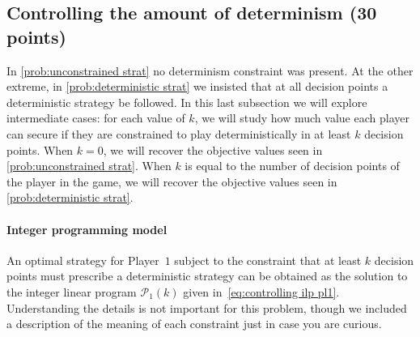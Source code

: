 \documentclass{homework}
\begin{document}
\subsection{Controlling the amount of determinism (30 points)}

In \cref{prob:unconstrained strat} no determinism constraint was present. At the other extreme, in \cref{prob:deterministic strat} we insisted that at all decision points a deterministic strategy be followed. In this last subsection we will explore intermediate cases: for each value of $k$, we will study how much value each player can secure if they are constrained to play deterministically in at least $k$ decision points. When $k=0$, we will recover the objective values seen in \cref{prob:unconstrained strat}. When $k$ is equal to the number of decision points of the player in the game, we will recover the objective values seen in \cref{prob:deterministic strat}.

\paragraph{Integer programming model} An optimal strategy for Player~$1$ subject to the constraint that at least $k$ decision points must prescribe a deterministic strategy can be obtained as the solution to the integer linear program $\mathcal{P}_1(k)$ given in~\eqref{eq:controlling ilp pl1}. Understanding the details is not important for this problem, though we included a description of the meaning of each constraint just in case you are curious. 
\end{document}
